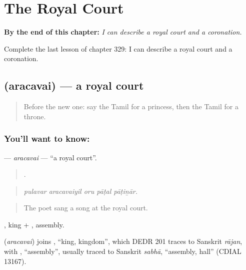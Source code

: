 
\chapter{The Royal Court}
\label{ch:ta-the-royal-court}

\begin{chapteropening}
\textbf{By the end of this chapter:} \emph{I can describe a royal court and a coronation.}

Complete the last lesson of chapter 329: I can describe a royal court and a coronation.
\end{chapteropening}

\section[\texorpdfstring{\ta{அரசவை} (aracavai)}{அரசவை (aracavai)}]{ (aracavai) — a royal court}

\label{lesson:TA-C329-aracavai}



\begin{quote}
Before the new one: say the Tamil for a princess, then the Tamil for a throne.
\end{quote}

\subsection*{You'll want to know: }
\textbf{} — \emph{aracavai} — \textquotedblleft{}a royal court\textquotedblright{}.

\begin{quote}
    .
\end{quote}

\begin{quote}
\emph{pulavar aracavaiyil oru pāṭal pāṭiṉār.}
\end{quote}

\begin{quote}
The poet sang a song at the royal court.
\end{quote}

, king + , assembly.

\begin{cousinweb}
\textbf{} (\emph{aracavai}) joins , \textquotedblleft{}king, kingdom\textquotedblright{}, which DEDR 201 traces to Sanskrit \emph{rājan}, with , \textquotedblleft{}assembly\textquotedblright{}, usually traced to Sanskrit \emph{sabhā}, \textquotedblleft{}assembly, hall\textquotedblright{} (CDIAL 13167).
\end{cousinweb}

